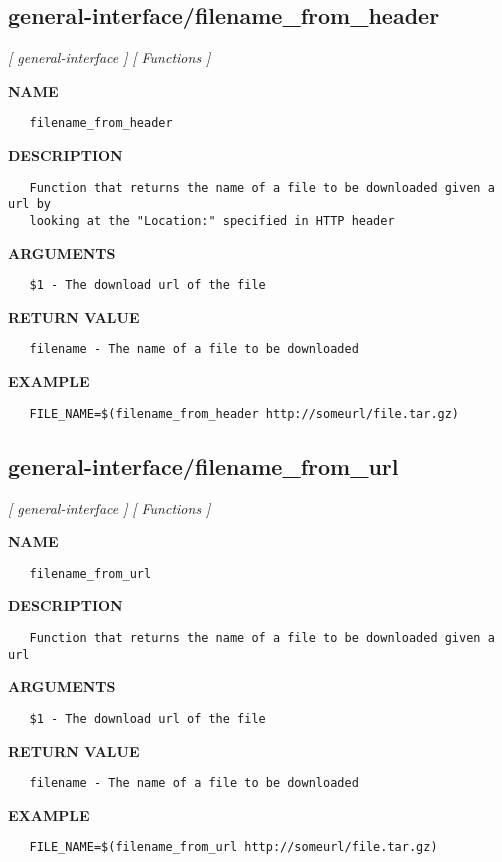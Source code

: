 \subsection{general-interface/filename\_from\_header}
\textsl{[ general-interface ]}
\textsl{[ Functions ]}

\label{ch:robo22}
\label{ch:general_interface_filename_from_header}
\textbf{NAME}
\begin{verbatim}
   filename_from_header
\end{verbatim}
\textbf{DESCRIPTION}
\begin{verbatim}
   Function that returns the name of a file to be downloaded given a url by
   looking at the "Location:" specified in HTTP header
\end{verbatim}
\textbf{ARGUMENTS}
\begin{verbatim}
   $1 - The download url of the file
\end{verbatim}
\textbf{RETURN VALUE}
\begin{verbatim}
   filename - The name of a file to be downloaded
\end{verbatim}
\textbf{EXAMPLE}
\begin{verbatim}
   FILE_NAME=$(filename_from_header http://someurl/file.tar.gz)
\end{verbatim}
\newpage
\subsection{general-interface/filename\_from\_url}
\textsl{[ general-interface ]}
\textsl{[ Functions ]}

\label{ch:robo23}
\label{ch:general_interface_filename_from_url}
\textbf{NAME}
\begin{verbatim}
   filename_from_url
\end{verbatim}
\textbf{DESCRIPTION}
\begin{verbatim}
   Function that returns the name of a file to be downloaded given a url
\end{verbatim}
\textbf{ARGUMENTS}
\begin{verbatim}
   $1 - The download url of the file
\end{verbatim}
\textbf{RETURN VALUE}
\begin{verbatim}
   filename - The name of a file to be downloaded
\end{verbatim}
\textbf{EXAMPLE}
\begin{verbatim}
   FILE_NAME=$(filename_from_url http://someurl/file.tar.gz)
\end{verbatim}
\newpage
